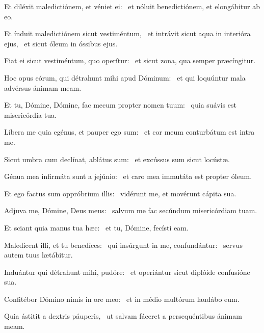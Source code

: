\item Et diléxit maledictiónem, et véniet ei:~\psstar{} et nóluit benedictiónem, et elongábitur ab eo.

\item Et índuit maledictiónem sicut vestiméntum,~\pscross{} et intrávit sicut aqua in interióra ejus,~\psstar{} et sicut óleum in óssibus ejus.

\item Fiat ei sicut vestiméntum, quo operítur:~\psstar{} et sicut zona, qua semper præcíngitur.

\item Hoc opus eórum, qui détrahunt mihi apud Dóminum:~\psstar{} et qui loquúntur mala advérsus ánimam meam.

\item Et tu, Dómine, Dómine, fac mecum propter nomen tuum:~\psstar{} quia suávis est misericórdia tua.

\item Líbera me quia egénus, et pauper ego sum:~\psstar{} et cor meum conturbátum est intra me.

\item Sicut umbra cum declínat, ablátus sum:~\psstar{} et excússus sum sicut locústæ.

\item Génua mea infirmáta sunt a jejúnio:~\psstar{} et caro mea immutáta est propter óleum.

\item Et ego factus sum oppróbrium illis:~\psstar{} vidérunt me, et movérunt cápita sua.

\item Adjuva me, Dómine, Deus meus:~\psstar{} salvum me fac secúndum misericórdiam tuam.

\item Et sciant quia manus tua hæc:~\psstar{} et tu, Dómine, fecísti eam.

\item Maledícent illi, et tu benedíces:~\pscross{} qui insúrgunt in me, confundántur:~\psstar{} servus autem tuus lætábitur.

\item Induántur qui détrahunt mihi, pudóre:~\psstar{} et operiántur sicut diplóide confusióne sua.

\item Confitébor Dómino nimis in ore meo:~\psstar{} et in médio multórum laudábo eum.

\item Quia ástitit a dextris páuperis,~\psstar{} ut salvam fáceret a persequéntibus ánimam meam.
